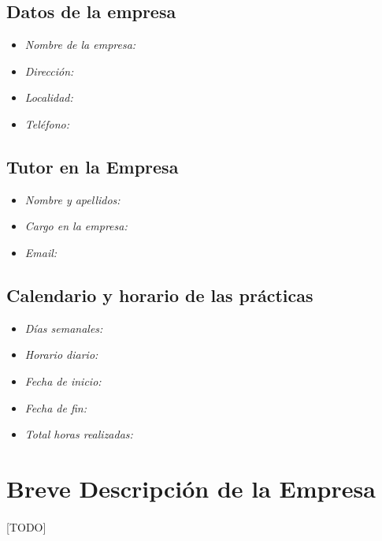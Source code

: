 \documentclass[a4paper,spanish]{article}
\begin{document}
    \subsection{Datos de la empresa}

      \begin{itemize}
        \item \emph{Nombre de la empresa:}
        \item \emph{Dirección:}
        \item \emph{Localidad:}
        \item \emph{Teléfono:}
      \end{itemize}


    \subsection{Tutor en la Empresa}

      \begin{itemize}
        \item \emph{Nombre y apellidos:}
        \item \emph{Cargo en la empresa:}
        \item \emph{Email:}
      \end{itemize}


    \subsection{Calendario y horario de las prácticas}

      \begin{itemize}
        \item \emph{Días semanales:}
        \item \emph{Horario diario:}
        \item \emph{Fecha de inicio:}
        \item \emph{Fecha de fin:}
        \item \emph{Total horas realizadas:}
      \end{itemize}

	\newpage
  \section{Breve Descripción de la Empresa}

    \paragraph{}
    [TODO]
\end{document}
